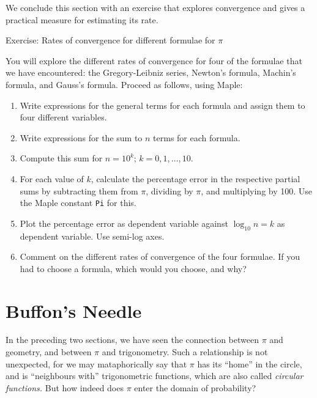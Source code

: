 \documentclass[11pt,a4paper,onecolumn]{article}
\newenvironment{exercise}{\color [named]{RawSienna} \let \parsave=\parindent%
\setlength{\parindent}{0pt} \sffamily Exercise: }%
{\setlength{\parindent}{\parsave}}
\newenvironment{edbox}[1]{\let \parsave=\parindent%
\setlength{\parindent}{0pt}%
\vspace{\parsep}\fbox%
{\parbox{\textwidth}{\vspace{\parsep}#1}}}%
{\vspace{\parsep}\setlength{\parindent}{\parsave}}
\newcommand{\map}{Maple}
\newcommand{\maps}{Maple }
\begin{document}
We conclude this section with an exercise that explores convergence and gives a practical measure for estimating its rate.

\begin{edbox}{%
\begin{exercise}{Rates of convergence for different formulae for $\pi$ \\}

You will explore the different rates of convergence for four of the  formulae that we have encountered: the Gregory-Leibniz series, Newton's formula, Machin's formula, and Gauss's formula.  Proceed as follows, using \map:%
\begin{enumerate}

\item Write expressions for the general terms for each formula and assign them to four different variables.

\item Write expressions for the sum to $n$ terms for each formula.

\item Compute this sum for $n = 10^k; \, k = 0, 1, \dots , 10$.

\item For each value of $k$, calculate the percentage error in the respective partial sums by subtracting them from $\pi$, dividing by $\pi$, and multiplying by 100.  Use the \maps constant \texttt{Pi} for this. 

\item Plot the percentage error as dependent variable against $\log_{10}n = k$ as dependent variable.  Use semi-log axes.

\item Comment on the different rates of convergence of the four formulae.  If you had to choose a formula, which would you choose, and why?
%
\end{enumerate}
\end{exercise}}
\end{edbox}

\section{Buffon's Needle}\label{sec:buffon}

In the preceding two sections, we have seen the connection between
$\pi$ and geometry, and between $\pi$ and trigonometry.  Such a
relationship is not unexpected, for we may mataphorically say that
$\pi$ has its ``home'' in the circle, and is ``neighbours with''
trigonometric functions, which are also called \emph{circular
functions.}  But how indeed does $\pi$ enter the domain of
probability?
\end{document}
